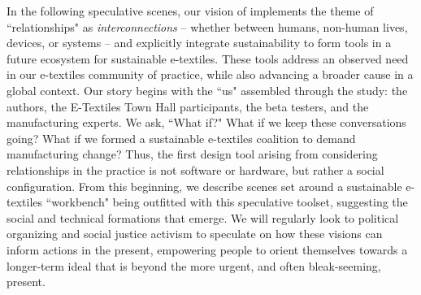 In the following speculative scenes, our vision of  implements the theme of ``relationships" as \textit{interconnections} -- whether between humans, non-human lives, devices, or systems -- and explicitly integrate sustainability to form tools in a future ecosystem for sustainable e-textiles. These tools address an observed need in our e-textiles community of practice, while also advancing a broader cause in a global context. Our story begins with the ``us" assembled through the study: the authors, the E-Textiles Town Hall participants, the beta testers, and the manufacturing experts. We ask, ``What if?" What if we keep these conversations going? What if we formed a sustainable e-textiles coalition to demand manufacturing change? Thus, the first design tool arising from considering relationships in the practice is not software or hardware, but rather a social configuration. From this beginning, we describe scenes set around a sustainable e-textiles ``workbench" being outfitted with this speculative toolset, suggesting the social and technical formations that emerge. We will regularly look to political organizing and social justice activism to speculate on how these visions can inform actions in the present, empowering people to orient themselves towards a longer-term ideal that is beyond the more urgent, and often bleak-seeming, present.  


